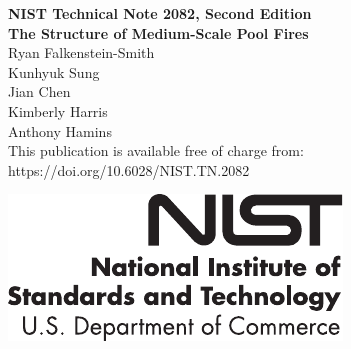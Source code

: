 \documentclass[12pt]{article}
\newcommand{\pubnumber}{2082, Second Edition}
\newcommand{\DOI}{https://doi.org/10.6028/NIST.TN.2082}
\begin{document}
	
	\begin{titlepage}
		\begin{flushright}
\LARGE{\textbf{NIST Technical Note \pubnumber}}\\
\vfill
\Huge{\textbf{The Structure of Medium-Scale Pool Fires}}\\
\vfill
\large Ryan Falkenstein-Smith\\
\large Kunhyuk Sung\\
\large Jian Chen\\
\large Kimberly Harris\\
\large Anthony Hamins\\
\vfill
\normalsize This publication is available free of charge from:\\
\DOI\\
\vfill

\includegraphics[width=0.3\linewidth]{NIST-logo}\\


\end{flushright}
\end{titlepage}
\end{document}
